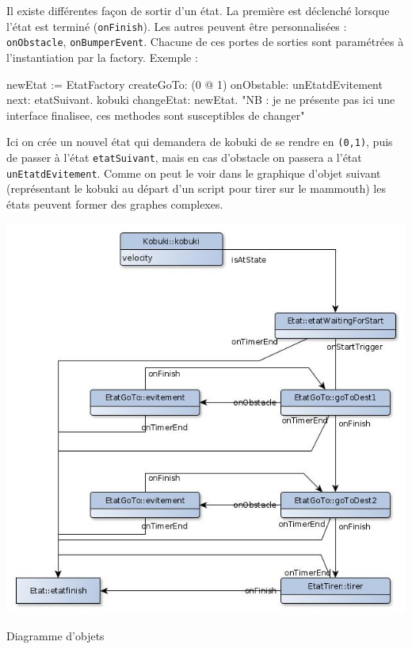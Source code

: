 \documentclass[a4paper, 11pt]{article}
\begin{document}
Il existe différentes façon de sortir d'un état. La première est
déclenché lorsque l'état est terminé (\texttt{onFinish}). Les autres
peuvent être personnalisées : \texttt{onObstacle},
\texttt{onBumperEvent}. Chacune de ces portes de sorties sont
paramétrées à l'instantiation par la factory. Exemple :

\begin{code}
  newEtat := EtatFactory createGoTo: (0 @ 1) onObstable: unEtatdEvitement next: etatSuivant.
  kobuki changeEtat: newEtat.
  "NB : je ne présente pas ici une interface finalisee, ces methodes sont susceptibles de changer"
\end{code}

Ici on crée un nouvel état qui demandera de kobuki de se rendre en
\texttt{(0,1)}, puis de passer à l'état \texttt{etatSuivant}, mais en
cas d'obstacle on passera a l'état \texttt{unEtatdEvitement}.  Comme
on peut le voir dans le graphique d'objet suivant (représentant le
kobuki au départ d'un script pour tirer sur le mammouth) les états
peuvent former des graphes complexes.
\begin{center}
  \includegraphics[width=\linewidth]{./UMLObjectEtat.jpg}
  \caption{Diagramme d'objets}
  \label{dia_obj}
\end{center}
\end{document}
